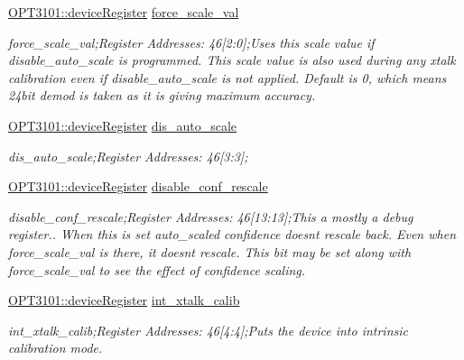 \begin{DoxyCompactItemize}
\mbox{\hyperlink{class_o_p_t3101_1_1device_register}{O\+P\+T3101\+::device\+Register}} \mbox{\hyperlink{class_o_p_t3101_1_1registers_afe99c7a5fffb295c9922f8c28ab99a96}{force\+\_\+scale\+\_\+val}}
\begin{DoxyCompactList}\small\item\em force\+\_\+scale\+\_\+val;Register Addresses\+: 46\mbox{[}2\+:0\mbox{]};Uses this scale value if disable\+\_\+auto\+\_\+scale is programmed. This scale value is also used during any xtalk calibration even if disable\+\_\+auto\+\_\+scale is not applied. Default is \textquotesingle{}0\textquotesingle{}, which means 24bit demod is taken as it is giving maximum accuracy. \end{DoxyCompactList}\item 
\mbox{\hyperlink{class_o_p_t3101_1_1device_register}{O\+P\+T3101\+::device\+Register}} \mbox{\hyperlink{class_o_p_t3101_1_1registers_a7a537a29f35952186fdc28d06cee3529}{dis\+\_\+auto\+\_\+scale}}
\begin{DoxyCompactList}\small\item\em dis\+\_\+auto\+\_\+scale;Register Addresses\+: 46\mbox{[}3\+:3\mbox{]}; \end{DoxyCompactList}\item 
\mbox{\hyperlink{class_o_p_t3101_1_1device_register}{O\+P\+T3101\+::device\+Register}} \mbox{\hyperlink{class_o_p_t3101_1_1registers_a2cf64206b57b26fb7a65e15dc2e6ccda}{disable\+\_\+conf\+\_\+rescale}}
\begin{DoxyCompactList}\small\item\em disable\+\_\+conf\+\_\+rescale;Register Addresses\+: 46\mbox{[}13\+:13\mbox{]};This a mostly a debug register.. When this is set auto\+\_\+scaled confidence doesn\textquotesingle{}t rescale back. Even when force\+\_\+scale\+\_\+val is there, it doesn\textquotesingle{}t rescale. This bit may be set along with force\+\_\+scale\+\_\+val to see the effect of confidence scaling. \end{DoxyCompactList}\item 
\mbox{\hyperlink{class_o_p_t3101_1_1device_register}{O\+P\+T3101\+::device\+Register}} \mbox{\hyperlink{class_o_p_t3101_1_1registers_a60e7f3df0ffecc327ff9c141797a523a}{int\+\_\+xtalk\+\_\+calib}}
\begin{DoxyCompactList}\small\item\em int\+\_\+xtalk\+\_\+calib;Register Addresses\+: 46\mbox{[}4\+:4\mbox{]};Puts the device into intrinsic calibration mode. \end{DoxyCompactList}\item 

\end{DoxyCompactItemize}
